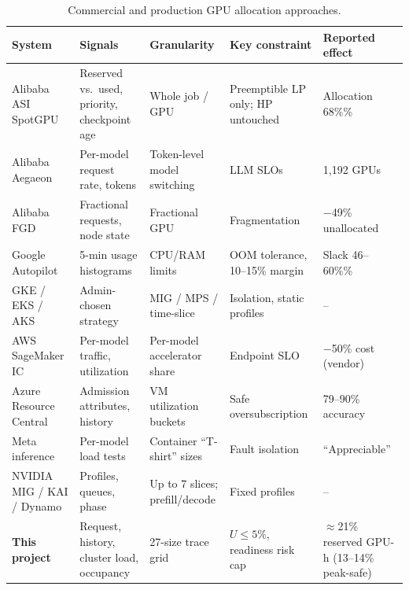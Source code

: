 \begin{table}[h]
\centering\scriptsize
\caption{Commercial and production GPU allocation approaches.}
\label{tab:industry}
\begin{tabularx}{\linewidth}{@{}P{2.3cm}P{2.6cm}P{2.3cm}LP{2.2cm}@{}}
\toprule
System & Signals & Granularity & Key constraint & Reported effect \\
\midrule
Alibaba ASI SpotGPU & Reserved vs.\ used, priority, checkpoint age & Whole job / GPU & Preemptible LP only; HP untouched & Allocation 68\%\% \\
Alibaba Aegaeon & Per-model request rate, tokens & Token-level model switching & LLM SLOs & 1{,}192 GPUs \\
Alibaba FGD & Fractional requests, node state & Fractional GPU & Fragmentation & $-$49\% unallocated \\
Google Autopilot & 5-min usage histograms & CPU/RAM limits & OOM tolerance, 10--15\% margin & Slack 46--60\%\% \\
GKE / EKS / AKS & Admin-chosen strategy & MIG / MPS / time-slice & Isolation, static profiles & -- \\
AWS SageMaker IC & Per-model traffic, utilization & Per-model accelerator share & Endpoint SLO & $-$50\% cost (vendor) \\
Azure Resource Central & Admission attributes, history & VM utilization buckets & Safe oversubscription & 79--90\% accuracy \\
Meta inference & Per-model load tests & Container ``T-shirt'' sizes & Fault isolation & ``Appreciable'' \\
NVIDIA MIG / KAI / Dynamo & Profiles, queues, phase & Up to 7 slices; prefill/decode & Fixed profiles & -- \\
\midrule
\textbf{This project} & Request, history, cluster load, occupancy & 27-size trace grid & $U \le 5\%$, readiness risk cap & $\approx$21\% reserved GPU-h (13--14\% peak-safe) \\
\bottomrule
\end{tabularx}
\end{table}
